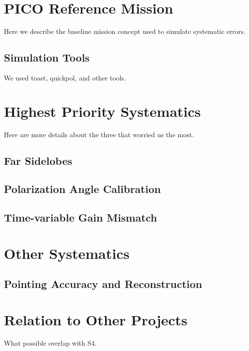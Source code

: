 \documentclass[12pt]{article}
\begin{document}
\section{PICO Reference Mission}

Here we describe the baseline mission concept used to simulate systematic errors.

\subsection{Simulation Tools}

We used toast, quickpol, and other tools.

\section{Highest Priority Systematics}

Here are more details about the three that worried us the most.

\subsection{Far Sidelobes}
\label{sec:fsl}

\subsection{Polarization Angle Calibration}
\label{sec:angle}

\subsection{Time-variable Gain Mismatch}
\label{sec:gain}

\section{Other Systematics}

\subsection{Pointing Accuracy and Reconstruction}

\section{Relation to Other Projects}

What possible overlap with S4.

\newpage


\end{document}
